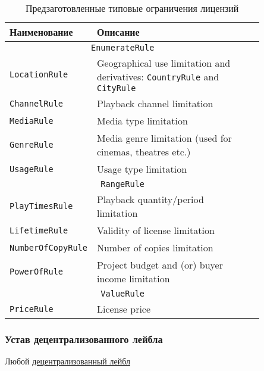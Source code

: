 \documentclass[12pt]{report}
\def\code#1{\colorbox{light-gray}{\texttt{#1}}}
\begin{document}
\begin{table}[h]
\centering
\caption{Предзаготовленные типовые ограничения лицензий}
\begin{tabular}{p{0.2\linewidth}p{0.65\linewidth}cc}
\toprule
Наименование & Описание \\
\bottomrule
\toprule
\multicolumn{2}{c}{\code{EnumerateRule}} \\
\midrule
	\code{LocationRule} & Geographical use limitation and derivatives: \code{CountryRule} and \code{CityRule} \\
	\code{ChannelRule} & Playback channel limitation \\
	\code{MediaRule} & Media type limitation \\
	\code{GenreRule} & Media genre limitation (used for cinemas, theatres etc.) \\
	\code{UsageRule} & Usage type limitation \\
\bottomrule
\toprule
\multicolumn{2}{c}{\code{RangeRule}} \\
\midrule
	\code{PlayTimesRule} & Playback quantity/period limitation \\
	\code{LifetimeRule} & Validity of license limitation \\
	\code{NumberOfCopyRule} & Number of copies limitation \\
	\code{PowerOfRule} & Project budget and (or) buyer income limitation \\
\bottomrule
\toprule
\multicolumn{2}{c}{\code{ValueRule}} \\
\midrule
	\code{PriceRule} & License price \\
\bottomrule
\end{tabular}
\end{table}

\subsubsection{Устав децентрализованного лейбла}
\label{tech-apps-dal-charter}
\begin{multicols}{2}
Любой \hyperref[tech-apps-dal]{децентрализованный лейбл} 
\end{multicols}
\end{document}

